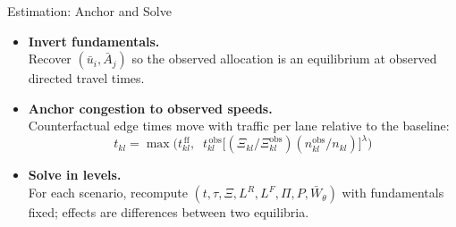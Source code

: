 \documentclass[11pt,aspectratio=169]{beamer}
\begin{document}
\begin{frame}{Estimation: Anchor and Solve}
\begin{itemize}\small
  \item \textbf{Invert fundamentals.}\\[-0.1em]
  {\footnotesize Recover $(\bar u_i,\bar A_j)$ so the observed allocation is an equilibrium at observed directed travel times.}
  \item \textbf{Anchor congestion to observed speeds.}\\[-0.1em]
  {\footnotesize Counterfactual edge times move with traffic per lane relative to the baseline:}
  \vspace{-0.35em}\begin{equation}\label{eq:anchor}
    t_{kl}=\max\!\Big( t_{kl}^{\,\mathrm{ff}},\;\;
    t_{kl}^{\,\mathrm{obs}}\big[(\Xi_{kl}/\Xi_{kl}^{\mathrm{obs}})(n_{kl}^{\mathrm{obs}}/n_{kl})\big]^{\lambda}\Big)
  \end{equation}
  \item \textbf{Solve in levels.}\\[-0.1em]
  {\footnotesize For each scenario, recompute $(t,\tau,\Xi,L^R,L^F,\Pi,P,\bar W_\theta)$ with fundamentals fixed; effects are differences between two equilibria.}
\end{itemize}
\end{frame}
\end{document}
